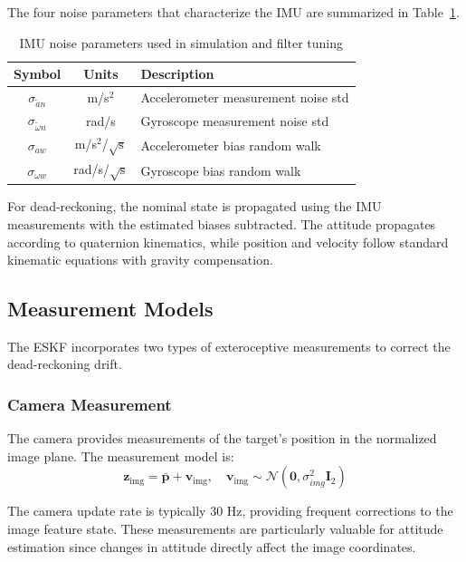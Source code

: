 \documentclass[11pt,a4paper]{article}
\newcommand{\pbar}{\bar{\mathbf{p}}}
\newcommand{\I}{\mathbf{I}}
\begin{document}
The four noise parameters that characterize the IMU are summarized in Table~\ref{tab:imu_params}.

\begin{table}[h]
\centering
\begin{tabular}{ccl}
\toprule
Symbol & Units & Description \\
\midrule
$\sigma_{\tilde{a}n}$ & m/s$^2$ & Accelerometer measurement noise std \\
$\sigma_{\tilde{\omega}n}$ & rad/s & Gyroscope measurement noise std \\
$\sigma_{aw}$ & m/s$^2$/$\sqrt{\text{s}}$ & Accelerometer bias random walk \\
$\sigma_{\omega w}$ & rad/s/$\sqrt{\text{s}}$ & Gyroscope bias random walk \\
\bottomrule
\end{tabular}
\caption{IMU noise parameters used in simulation and filter tuning}
\label{tab:imu_params}
\end{table}

For dead-reckoning, the nominal state is propagated using the IMU measurements with the estimated biases subtracted. The attitude propagates according to quaternion kinematics, while position and velocity follow standard kinematic equations with gravity compensation.

\subsection{Measurement Models}

The ESKF incorporates two types of exteroceptive measurements to correct the dead-reckoning drift.

\subsubsection{Camera Measurement}
The camera provides measurements of the target's position in the normalized image plane. The measurement model is:
\begin{equation}
    \mathbf{z}_{\text{img}} = \pbar + \mathbf{v}_{\text{img}}, \quad \mathbf{v}_{\text{img}} \sim \mathcal{N}(\mathbf{0}, \sigma_{img}^2 \I_2)
\end{equation}

The camera update rate is typically 30 Hz, providing frequent corrections to the image feature state. These measurements are particularly valuable for attitude estimation since changes in attitude directly affect the image coordinates.
\end{document}
